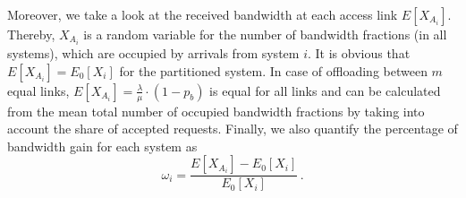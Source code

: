 Moreover, we take a look at the received bandwidth at each access link $E[X_{A_i}]$. Thereby, $X_{A_i}$ is a random variable for the number of bandwidth fractions (in all systems), which are occupied by arrivals from system $i$. It is obvious that $E[X_{A_i}] = E_0[X_i]$ for the partitioned system. In case of offloading between $m$ equal links, $E[X_{A_i}]= \frac{\lambda}{\mu}\cdot (1-p_{b})$ is equal for all links and can be calculated from the mean total number of occupied bandwidth fractions by taking into account the share of accepted requests.
Finally, we also quantify the percentage of bandwidth gain for each system as
\begin{equation}
\omega_i = \frac{E[X_{A_i}]-E_0[X_i]}{E_0[X_i]}\, .
\end{equation}
